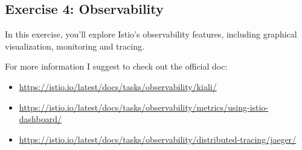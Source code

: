 \documentclass{article}
\begin{document}
\begin{enumerate}
\end{enumerate}

\subsection{Exercise 4: Observability}
In this exercise, you'll explore Istio's observability features, including graphical visualization, monitoring and tracing.

For more information I suggest to check out the official doc: 
\footnotesize
\begin{itemize}
  \item \url{https://istio.io/latest/docs/tasks/observability/kiali/}
  \item \url{https://istio.io/latest/docs/tasks/observability/metrics/using-istio-dashboard/}
  \item \url{https://istio.io/latest/docs/tasks/observability/distributed-tracing/jaeger/} \\
\end{itemize}

\normalsize
\end{document}
